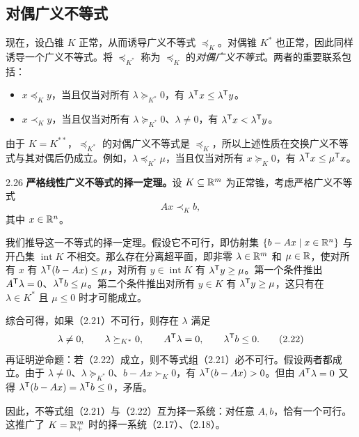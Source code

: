 \subsection{对偶广义不等式}
现在，设凸锥 $K$ 正常，从而诱导广义不等式 $\preceq_K$。对偶锥 $K^*$ 也正常，因此同样诱导一个广义不等式。将 $\preceq_{K^*}$ 称为 $\preceq_K$ 的\emph{对偶广义不等式}。两者的重要联系包括：
\begin{itemize}
\item $x\preceq_K y$，当且仅当对所有 $\lambda\succeq_{K^*}0$，有 $\lambda^{\mathsf T}x\le\lambda^{\mathsf T}y$。
\item $x\prec_K y$，当且仅当对所有 $\lambda\succeq_{K^*}0$、$\lambda\ne0$，有 $\lambda^{\mathsf T}x<\lambda^{\mathsf T}y$。
\end{itemize}
由于 $K=K^{**}$，$\preceq_{K^*}$ 的对偶广义不等式是 $\preceq_K$，所以上述性质在交换广义不等式与其对偶后仍成立。例如，$\lambda\preceq_{K^*}\mu$，当且仅当对所有 $x\succeq_K0$，有 $\lambda^{\mathsf T}x\le\mu^{\mathsf T}x$。

\begin{origexample}{2.26}
\textbf{严格线性广义不等式的择一定理。}设 $K\subseteq\mathbb R^m$ 为正常锥，考虑严格广义不等式
\begin{equation}
 Ax\prec_K b,\tag{2.21}
\end{equation}
其中 $x\in\mathbb R^n$。

我们推导这一不等式的择一定理。假设它不可行，即仿射集 $\{b-Ax\mid x\in\mathbb R^n\}$ 与开凸集 $\operatorname{int}K$ 不相交。那么存在分离超平面，即非零 $\lambda\in\mathbb R^m$ 和 $\mu\in\mathbb R$，使对所有 $x$ 有 $\lambda^{\mathsf T}(b-Ax)\le\mu$，对所有 $y\in\operatorname{int}K$ 有 $\lambda^{\mathsf T}y\ge\mu$。第一个条件推出 $A^{\mathsf T}\lambda=0$、$\lambda^{\mathsf T}b\le\mu$。第二个条件推出对所有 $y\in K$ 有 $\lambda^{\mathsf T}y\ge\mu$，这只有在 $\lambda\in K^*$ 且 $\mu\le0$ 时才可能成立。

综合可得，如果（2.21）不可行，则存在 $\lambda$ 满足
\begin{equation}
 \lambda\ne0,\qquad\lambda\succeq_{K^*}0,\qquad
 A^{\mathsf T}\lambda=0,\qquad\lambda^{\mathsf T}b\le0.\tag{2.22}
\end{equation}
再证明逆命题：若（2.22）成立，则不等式组（2.21）必不可行。假设两者都成立。由于 $\lambda\ne0$、$\lambda\succeq_{K^*}0$、$b-Ax\succ_K0$，有 $\lambda^{\mathsf T}(b-Ax)>0$。但由 $A^{\mathsf T}\lambda=0$ 又得 $\lambda^{\mathsf T}(b-Ax)=\lambda^{\mathsf T}b\le0$，矛盾。

因此，不等式组（2.21）与（2.22）互为择一系统：对任意 $A,b$，恰有一个可行。这推广了 $K=\mathbb R_+^m$ 时的择一系统（2.17）、（2.18）。
\end{origexample}

